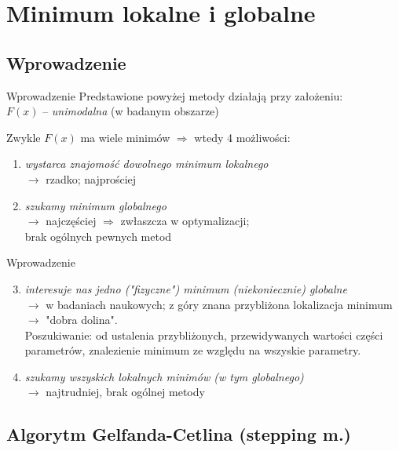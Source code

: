 \section{Minimum lokalne i globalne}

\subsection{Wprowadzenie}

  \begin{frame}{Wprowadzenie}
    Predstawione powyżej metody działają przy założeniu:\\
    $F(x)$ -- \emph{unimodalna} (w badanym obszarze)
    \begin{block}{Zwykle $F(x)$ ma wiele minimów $\Rightarrow$ wtedy 4 możliwości:}
      \begin{enumerate}
        \item \emph{wystarca znajomość dowolnego minimum lokalnego}\\
        $\to$ rzadko; najprościej
        \item \emph{szukamy minimum globalnego}\\
        $\to$ najczęściej $\Rightarrow$ zwłaszcza w optymalizacji;\\
        brak ogólnych pewnych metod %

      \end{enumerate}
    \end{block}
  \end{frame}

  \begin{frame}{Wprowadzenie}
    \begin{block}{}
      \begin{enumerate}
        \setcounter{enumi}{2}
        \item \emph{interesuje nas jedno ("fizyczne") minimum
        (niekoniecznie) globalne}\\
        $\to$ w badaniach naukowych; z góry znana przybliżona
        lokalizacja minimum $\to$ "dobra dolina". \\
        Poszukiwanie: od ustalenia przybliżonych, przewidywanych
        wartości części parametrów, znalezienie minimum ze
        względu na wszyskie parametry.
        \item \emph{szukamy wszyskich lokalnych minimów
        (w tym globalnego)} \\
        $\to$ najtrudniej, brak ogólnej metody
      \end{enumerate}
    \end{block}
  \end{frame}

\subsection{Algorytm Gelfanda-Cetlina (stepping m.)}
